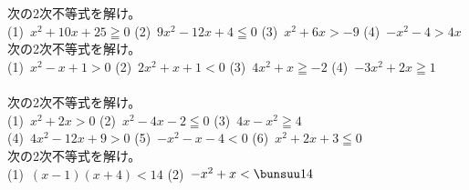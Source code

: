 \begin{multicols*}{4}
  \columnbreak{}\\
  \columnbreak{}\\
  \null\vfill
  次の2次不等式を解け。
  \vspace{.5zw}\\
  (1)\ $x^2+10x+25 \geqq 0$
  (2)\ $9x^2-12x+4 \leqq 0$
  (3)\ $x^2+6x > -9$
  (4)\ $-x^2-4 > 4x$
  \columnbreak{}\\
  \null\vfill
  次の2次不等式を解け。
  \vspace{.5zw}\\
  (1)\ $x^2-x+1 > 0$
  (2)\ $2x^2+x+1 < 0$
  (3)\ $4x^2+x \geqq -2$
  (4)\ $-3x^2+2x \geqq 1$
  \columnbreak{}\\
  \columnbreak{}\\
  \null\vfill
  次の2次不等式を解け。
  \vspace{.5zw}\\
  (1)\ $x^2+2x > 0$
  (2)\ $x^2-4x-2 \leqq 0$
  (3)\ $4x-x^2 \geqq 4$
  \columnbreak{}\\
  \null\vfill
  (4)\ $4x^2-12x+9 > 0$
  (5)\ $-x^2-x-4 < 0$
  (6)\ $x^2+2x+3 \leqq 0$
  \columnbreak{}\\
  \null\vfill
  次の2次不等式を解け。
  \vspace{.5zw}\\
  (1)\ $(x-1)(x+4) < 14$
  (2)\ $-x^2+x < \bunsuu14$
  \ReturnBox


\end{multicols*}
